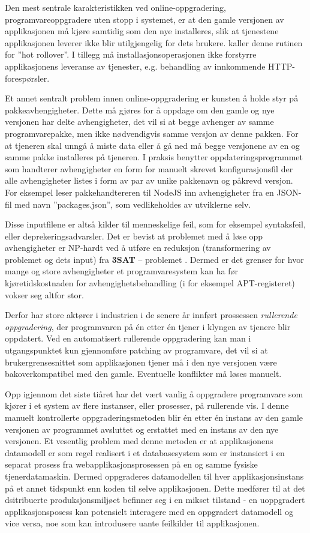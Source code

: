 Den mest sentrale karakteristikken ved online-oppgradering, programvareoppgradere uten stopp i systemet, er at den gamle versjonen av applikasjonen må kjøre samtidig som den nye installeres, slik at tjenestene applikasjonen leverer ikke blir utilgjengelig for dets brukere. \cite{choi2009} kaller denne rutinen for ''hot rollover''. I tillegg må installasjonsoperasjonen ikke forstyrre applikasjonens leveranse av tjenester, e.g. behandling av innkommende HTTP-forespørsler.

Et annet sentralt problem innen online-oppgradering er kunsten å holde styr på pakkeavhengigheter. Dette må gjøres for å oppdage om den gamle og nye versjonen har delte avhengigheter, det vil si at begge avhenger av samme programvarepakke, men ikke nødvendigvis samme versjon av denne pakken. For at tjeneren skal unngå å miste data eller å gå ned må begge versjonene av en og samme pakke installeres på tjeneren. I praksis benytter oppdateringsprogrammet som handterer avhengigheter en form for manuelt skrevet konfigurasjonsfil der alle avhengigheter listes i form av par av unike pakkenavn og påkrevd versjon. For eksempel leser pakkehandtereren til NodeJS inn avhengigheter fra en JSON-fil med navn ''packages.json'', som vedlikeholdes av utviklerne selv.

Disse inputfilene er altså kilder til menneskelige feil, som for eksempel syntaksfeil, eller deprekeringsadvarsler. Det er bevist at problemet med å løse opp avhengigheter er NP-hardt ved å utføre en reduksjon (transformering av problemet og dets input) fra \textbf{3SAT} -- problemet \citep{dumitracs2009upgrades}. Dermed er det grenser for hvor mange og store avhengigheter et programvaresystem kan ha før kjøretidskostnaden for avhengighetsbehandling (i for eksempel APT-registeret) vokser seg altfor stor.

Derfor har store aktører i industrien i de senere år innført prossessen \emph{rullerende oppgradering}, der programvaren på én etter én tjener i klyngen av tjenere blir oppdatert. Ved en automatisert rullerende oppgradering kan man i utgangspunktet kun gjennomføre patching av programvare, det vil si at brukergrensesnittet som applikasjonen tjener må i den nye versjonen være bakoverkompatibel med den gamle. Eventuelle konflikter må løses manuelt.

Opp igjennom det siste tiåret har det vært vanlig å oppgradere programvare som kjører i et system av flere instanser, eller prosesser, på rullerende vis. I denne manuelt kontrollerte oppgraderingsmetoden blir én etter én instans av den gamle versjonen av programmet avsluttet og erstattet med en instans av den nye versjonen. Et vesentlig problem med denne metoden er at applikasjonens datamodell er som regel realisert i et databasesystem som er instansiert i en separat prosess fra webapplikasjonsprosessen på en og samme fysiske tjenerdatamaskin. Dermed oppgraderes datamodellen til hver applikasjonsinstans på et annet tidspunkt enn koden til selve applikasjonen. Dette medfører til at det dsitribuerte produksjonsmiljøet befinner seg i en mikset tilstand - en uoppgradert applikasjonsposess kan potensielt interagere med en oppgradert datamodell og vice versa, noe som kan introdusere uante feilkilder til applikasjonen.
